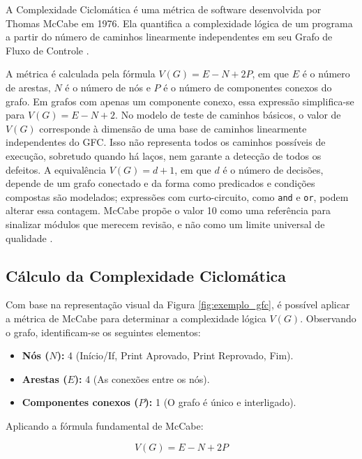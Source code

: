 A Complexidade Ciclomática é uma métrica de software desenvolvida por Thomas McCabe em 1976. Ela quantifica a complexidade lógica de um programa a partir do número de caminhos linearmente independentes em seu Grafo de Fluxo de Controle .

A métrica é calculada pela fórmula $V(G) = E - N + 2P$, em que $E$ é o número de arestas, $N$ é o número de nós e $P$ é o número de componentes conexos do grafo. Em grafos com apenas um componente conexo, essa expressão simplifica-se para $V(G) = E - N + 2$. No modelo de teste de caminhos básicos, o valor de $V(G)$ corresponde à dimensão de uma base de caminhos linearmente independentes do GFC. Isso não representa todos os caminhos possíveis de execução, sobretudo quando há laços, nem garante a detecção de todos os defeitos. A equivalência $V(G)=d+1$, em que $d$ é o número de decisões, depende de um grafo conectado e da forma como predicados e condições compostas são modelados; expressões com curto-circuito, como \texttt{and} e \texttt{or}, podem alterar essa contagem. McCabe propõe o valor 10 como uma referência para sinalizar módulos que merecem revisão, e não como um limite universal de qualidade .

\subsection{Cálculo da Complexidade Ciclomática}
Com base na representação visual da Figura \ref{fig:exemplo_gfc}, é possível aplicar a métrica de McCabe para determinar a complexidade lógica $V(G)$. Observando o grafo, identificam-se os seguintes elementos:

\begin{itemize}
    \item \textbf{Nós ($N$):} 4 (Início/If, Print Aprovado, Print Reprovado, Fim).
    \item \textbf{Arestas ($E$):} 4 (As conexões entre os nós).
    \item \textbf{Componentes conexos ($P$):} 1 (O grafo é único e interligado).
\end{itemize}

Aplicando a fórmula fundamental de McCabe:

\begin{equation}
    V(G) = E - N + 2P
\end{equation}

